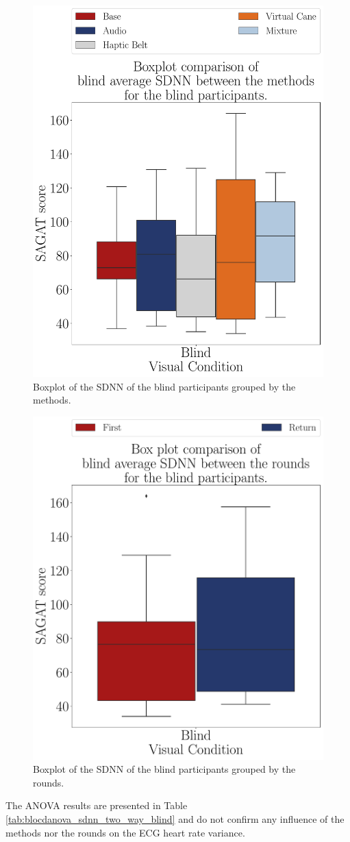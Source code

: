 \begin{figure}[!htb]
    \centering
    \includegraphics[width = 0.75\linewidth]{3 - Resultados/Figuras/boxplot_ecg_sdnn_blind_scene.pdf}
    \caption{Boxplot of the SDNN of the blind participants grouped by the methods.}
    \label{fig:boxplot_ecg_sdnn_blind_scene}
\end{figure}
\begin{figure}[!htb]
    \centering
    \includegraphics[width = 0.75\linewidth]{3 - Resultados/Figuras/boxplot_ecg_sdnn_blind_rounds.pdf}
    \caption{Boxplot of the SDNN of the blind participants grouped by the rounds.}
    \label{fig:boxplot_ecg_sdnn_blind_rounds}
\end{figure}

The ANOVA results are presented in Table \ref{tab:blocdanova_sdnn_two_way_blind} and do not confirm any influence of the methods nor the rounds on the ECG heart rate variance.


